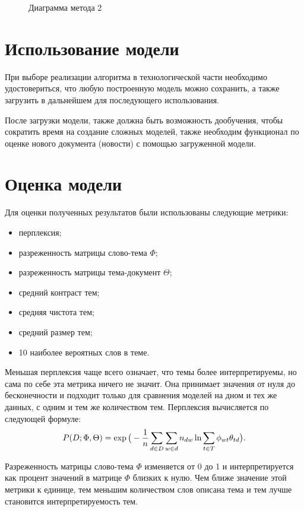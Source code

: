 \begin{figure}[h]
    \caption{Диаграмма метода 2}
    \label{fig:IDEF0_2}
\end{figure}
    
%
\section{Использование модели}

При выборе реализации алгоритма в технологической части необходимо удостовериться, что любую построенную модель можно сохранить, а также загрузить в дальнейшем для последующего использования.

После загрузки модели, также должна быть возможность дообучения, чтобы сократить время на создание сложных моделей, также необходим функционал по оценке нового документа (новости) с помощью загруженной модели.
%
\section{Оценка модели}

Для оценки полученных результатов были использованы следующие метрики:

\begin{itemize}
    \item перплексия;
    \item разреженность матрицы слово-тема $\Phi$;
    \item разреженность матрицы тема-документ $\Theta$;
    \item средний контраст тем;
    \item средняя чистота тем;
    \item средний размер тем;
    \item 10 наиболее вероятных слов в теме.
\end{itemize}

Меньшая перплексия чаще всего означает, что темы более интерпретируемы, но сама по себе эта метрика ничего не значит. Она принимает значения от нуля до бесконечности и подходит только для сравнения моделей на дном и тех же данных, с одним и тем же количеством тем. Перплексия вычисляется по следующей формуле:
$$
P(D;\Phi,\Theta) = \exp{\big( 
    -{{1}\over{n}} \sum_{d \in D}{
        \sum_{w \in d}{
            n_{dw} \ln{
                \sum_{t \in T}{
                    \phi_{wt} \theta_{td}
                }
            }
        }
    } 
\big)}.
$$

Разреженность матрицы слово-тема $\Phi$ изменяется от 0 до 1 и интерпретируется как процент значений в матрице $\Phi$ близких к нулю. Чем ближе значение этой метрики к единице, тем меньшим количеством слов описана тема и тем лучше становится интерпретируемость тем.

